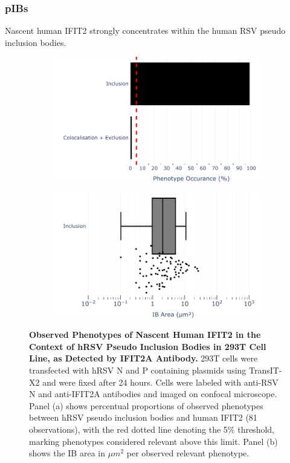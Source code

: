 \subsubsection{pIBs}
Nascent human IFIT2 strongly concentrates within the human RSV pseudo inclusion bodies.

\begin{figure}
    \begin{subfigure}{0.495\textwidth}
        \caption{}
        \includegraphics[width=1\linewidth]{09. Chapter 4/Figs/02. pIB/02. IFIT2A/01. bar_i2a_293t.pdf}
    \end{subfigure}
    \begin{subfigure}{0.495\textwidth}
        \caption{}
        \includegraphics[width=1\linewidth]{09. Chapter 4/Figs/02. pIB/02. IFIT2A/02. box_i2a_293t.pdf}
    \end{subfigure}
    \caption[Observed Phenotypes of Nascent Human IFIT2 in the Context of hRSV Pseudo Inclusion Bodies in 293T Cell Line, as Detected by IFIT2A Antibody.]{\textbf{Observed Phenotypes of Nascent Human IFIT2 in the Context of hRSV Pseudo Inclusion Bodies in 293T Cell Line, as Detected by IFIT2A Antibody.} 293T cells were transfected with hRSV N and P containing plasmids using TransIT-X2 and were fixed after 24 hours. Cells were labeled with anti-RSV N and anti-IFIT2A antibodies and imaged on confocal microscope. Panel (a) shows percentual proportions of observed phenotypes between hRSV pseudo inclusion bodies and human IFIT2 (81 observations), with the red dotted line denoting the 5\% threshold, marking phenotypes considered relevant above this limit. Panel (b) shows the IB area in \(\mu m^2\) per observed relevant phenotype.}

\end{figure}
